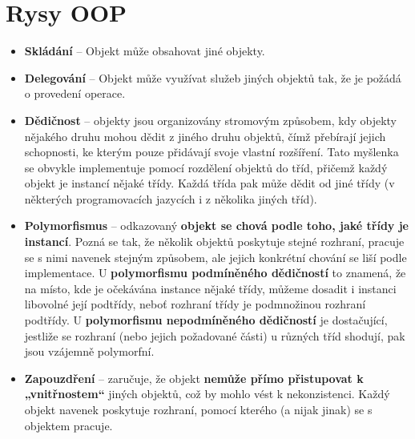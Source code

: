 \section{Rysy OOP}
\begin{itemize}
    \item \textbf{Skládání} -- Objekt může obsahovat jiné objekty.
    \item \textbf{Delegování} -- Objekt může využívat služeb jiných objektů tak, že je požádá o provedení operace.
    \item \textbf{Dědičnost} -- objekty jsou organizovány stromovým způsobem, kdy objekty nějakého druhu mohou dědit z jiného druhu objektů, čímž přebírají jejich schopnosti, ke kterým pouze přidávají svoje vlastní rozšíření. Tato myšlenka se obvykle implementuje pomocí rozdělení objektů do tříd, přičemž každý objekt je instancí nějaké třídy. Každá třída pak může dědit od jiné třídy (v některých programovacích jazycích i z několika jiných tříd).
    \item \textbf{Polymorfismus} -- odkazovaný\textbf{ objekt se chová podle toho, jaké třídy je instancí}. Pozná se tak, že několik objektů poskytuje stejné rozhraní, pracuje se s nimi navenek stejným způsobem, ale jejich konkrétní chování se liší podle implementace. U \textbf{polymorfismu podmíněného dědičností} to znamená, že na místo, kde je očekávána instance nějaké třídy, můžeme dosadit i instanci libovolné její podtřídy, neboť rozhraní třídy je podmnožinou rozhraní podtřídy. U \textbf{polymorfismu nepodmíněného dědičností} je dostačující, jestliže se rozhraní (nebo jejich požadované části) u různých tříd shodují, pak jsou vzájemně polymorfní.
    \item \textbf{Zapouzdření} -- zaručuje, že objekt \textbf{nemůže přímo přistupovat k „vnitřnostem“} jiných objektů, což by mohlo vést k nekonzistenci. Každý objekt navenek poskytuje rozhraní, pomocí kterého (a nijak jinak) se s objektem pracuje.
\end{itemize}